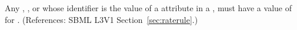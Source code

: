 Any \Compartment, \Species, \Parameter or \SpeciesReference whose identifier is the value of a
 attribute in a \RateRule, must have a value of 
for .  (References: SBML L3V1 Section~\ref{sec:raterule}.)
